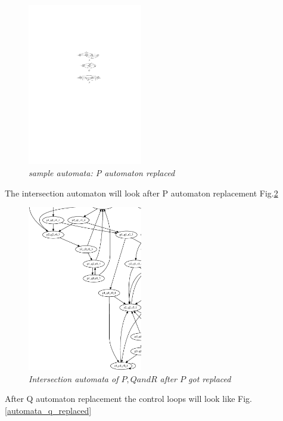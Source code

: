 \begin{figure}
\begin{center}
\includegraphics[width=50mm]{graph_after_p_replacement.pdf}
\end{center}
\caption{{\em sample automata: P automaton replaced}}
\label{automata_p_replaced}
\end{figure}


The intersection automaton will look after P automaton replacement Fig.\ref{graph_p_replaced}

\begin{figure}
\begin{center}
\includegraphics[width=50mm]{graph_p_replaced.eps}
\end{center}
\caption{{\em Intersection automata of $P, Q and R$ after $P$ got replaced}}
\label{graph_p_replaced}
\end{figure}

After Q automaton replacement the control loops will look like Fig. \ref{automata_q_replaced}

